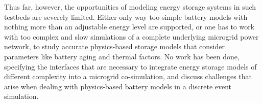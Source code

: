 Thus far, however, the opportunities of modeling energy storage systems in such testbeds are severely limited. Either only way too simple battery models with nothing more than an adjustable energy level are supported, or one has to work with too complex and slow simulations of a complete underlying microgrid power network, to study accurate physics-based storage models that consider parameters like battery aging and thermal factors. No work has been done, specifying the interfaces that are necessary to integrate energy storage models of different complexity into a microgrid co-simulation, and discuss challenges that arise when dealing with physics-based battery models in a discrete event simulation.